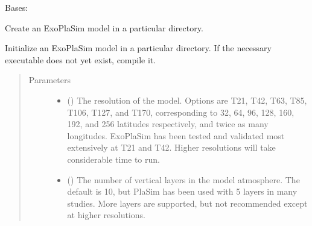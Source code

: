 \documentclass[letterpaper,10pt,english]{sphinxmanual}
\begin{document}
\begin{fulllineitems}
\label{\detokenize{source/exoplasim:exoplasim.Model}}
Bases: 

Create an ExoPlaSim model in a particular directory.

Initialize an ExoPlaSim model in a particular directory.
If the necessary executable does not yet exist, compile it.
\begin{quote}\begin{description}
\item[{Parameters}] \leavevmode\begin{itemize}
\item {} 
 (\sphinxstyleliteralemphasis{\sphinxupquote{, }}) \textendash{} The resolution of the model. Options are T21, T42, T63, T85,
T106, T127, and T170, corresponding to 32, 64, 96, 128, 160,
192, and 256 latitudes respectively, and twice as many
longitudes. ExoPlaSim has been tested and validated most
extensively at T21 and T42. Higher resolutions will take
considerable time to run.

\item {} 
 (\sphinxstyleliteralemphasis{\sphinxupquote{, }}) \textendash{} The number of vertical layers in the model atmosphere. The default
is 10, but PlaSim has been used with 5 layers in many studies.
More layers are supported, but not recommended except at higher
resolutions.


\end{itemize}
\end{description}
\end{quote}
\end{fulllineitems}
\end{document}
